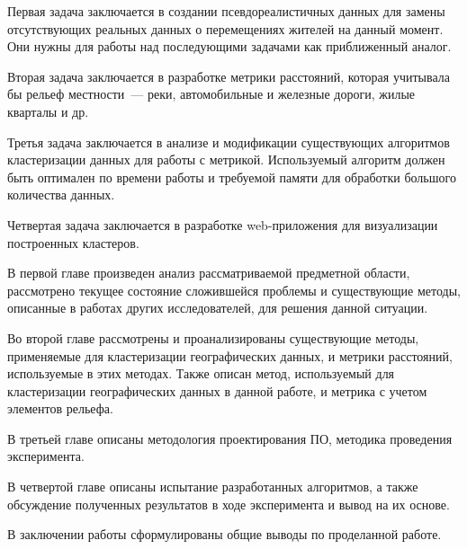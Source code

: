 Первая задача заключается в создании псевдореалистичных данных для замены отсутствующих реальных данных о перемещениях жителей на данный момент. Они нужны для работы над последующими задачами как приближенный аналог.

Вторая задача заключается в разработке метрики расстояний, которая учитывала бы рельеф местности~--- реки, автомобильные и железные дороги, жилые кварталы и др.

Третья задача заключается в анализе и модификации существующих алгоритмов кластеризации данных для работы с метрикой. Используемый алгоритм должен быть оптимален по времени работы и требуемой памяти для обработки большого количества данных.

Четвертая задача заключается в разработке web-приложения для визуализации построенных кластеров.

В первой главе произведен анализ рассматриваемой предметной области, рассмотрено текущее состояние сложившейся проблемы и существующие методы, описанные в работах других исследователей, для решения данной ситуации.

Во второй главе рассмотрены и проанализированы существующие методы, применяемые для кластеризации географических данных, и метрики расстояний, используемые в этих методах. Также описан метод, используемый для кластеризации географических данных в данной работе, и метрика с учетом элементов рельефа.

В третьей главе описаны методология проектирования ПО, методика проведения эксперимента.

В четвертой главе описаны испытание разработанных алгоритмов, а также обсуждение полученных результатов в ходе эксперимента и вывод на их основе.

В заключении работы сформулированы общие выводы по проделанной работе.
